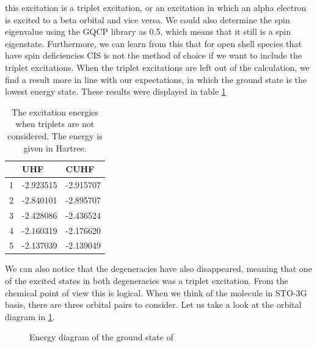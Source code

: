 \documentclass[twoside,twocolumn,9pt]{article}
\begin{document}
this excitation is a triplet excitation, or an excitation in which an alpha electron is excited to a beta orbital and vice versa. We could also determine the spin eigenvalue using
the GQCP library as 0.5, which means that it still is a spin eigenstate. Furthermore, we can learn from this that for open shell species that have spin
deficiencies CIS is not the method of choice if we want to include the triplet excitations. When the triplet excitations are left out of the calculation, we find a result more
in line with our expectations, in which the ground state is the lowest energy state. These results were displayed in table \ref{tab:excits_no_triplets}\\

\begin{table}[h]
  \caption{The excitation energies when triplets are not considered. The energy is given in Hartree.}
  \label{tab:excits_no_triplets}
  \begin{tabular}{l|l|l}
      & UHF       & CUHF      \\
    \hline
    1 & -2.923515 & -2.915707 \\
    2 & -2.840101 & -2.895707 \\
    3 & -2.428086 & -2.436524 \\
    4 & -2.160319 & -2.176620 \\
    5 & -2.137039 & -2.139049
  \end{tabular}
\end{table}

We can also notice that the degeneracies have also disappeared, meaning that one of the excited states in both degeneracies was a triplet excitation. From the chemical point of view
this is logical. When we think of the  molecule in STO-3G basis, there are three orbital pairs to consider. Let us take a look at the orbital diagram in \ref{fig:energydiag1}.

\begin{figure}[h]
  \begin{center}
  \end{center}
  \caption{Energy diagram of the ground state of }
  \label{fig:energydiag1}
\end{figure}
\end{document}
